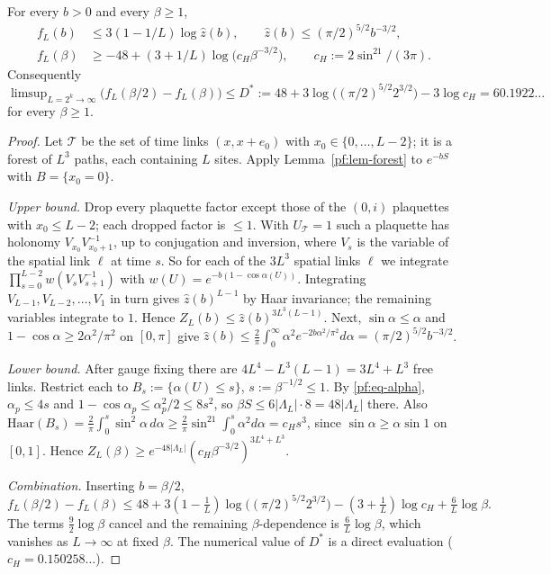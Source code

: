 \begin{lemma}\label{pf:lem-free}
For every $b>0$ and every $\beta\ge1$,
\begin{align*}
f_L(b)&\le3(1-1/L)\log\hat z(b),\qquad \hat z(b)\le(\pi/2)^{5/2}b^{-3/2},\\
f_L(\beta)&\ge-48+(3+1/L)\log\big(c_H\beta^{-3/2}\big),\qquad c_H:=2\sin^21/(3\pi).
\end{align*}
Consequently $\limsup_{L=2^k\to\infty}\big(f_L(\beta/2)-f_L(\beta)\big)\le D^*:=48+3\log\big((\pi/2)^{5/2}2^{3/2}\big)-3\log c_H=60.1922\ldots$ for every $\beta\ge1$.
\end{lemma}

\begin{proof}
Let $\mathcal T$ be the set of time links $(x,x+e_0)$ with $x_0\in\{0,\dots,L-2\}$; it is a forest of $L^3$ paths, each containing $L$ sites. Apply Lemma~\ref{pf:lem-forest} to $e^{-bS}$ with $B=\{x_0=0\}$.

\emph{Upper bound.} Drop every plaquette factor except those of the $(0,i)$ plaquettes with $x_0\le L-2$; each dropped factor is $\le1$. With $U_{\mathcal T}=1$ such a plaquette has holonomy $V_{x_0}V_{x_0+1}^{-1}$, up to conjugation and inversion, where $V_s$ is the variable of the spatial link $\ell$ at time $s$. So for each of the $3L^3$ spatial links $\ell$ we integrate $\prod_{s=0}^{L-2}w(V_sV_{s+1}^{-1})$ with $w(U)=e^{-b(1-\cos\alpha(U))}$. Integrating $V_{L-1},V_{L-2},\dots,V_1$ in turn gives $\hat z(b)^{L-1}$ by Haar invariance; the remaining variables integrate to $1$. Hence $Z_L(b)\le\hat z(b)^{3L^3(L-1)}$. Next, $\sin\alpha\le\alpha$ and $1-\cos\alpha\ge2\alpha^2/\pi^2$ on $[0,\pi]$ give
$\hat z(b)\le\frac2\pi\int_0^\infty\alpha^2e^{-2b\alpha^2/\pi^2}d\alpha=(\pi/2)^{5/2}b^{-3/2}$.

\emph{Lower bound.} After gauge fixing there are $4L^4-L^3(L-1)=3L^4+L^3$ free links. Restrict each to $B_s:=\{\alpha(U)\le s\}$, $s:=\beta^{-1/2}\le1$. By \eqref{pf:eq-alpha}, $\alpha_p\le4s$ and $1-\cos\alpha_p\le\alpha_p^2/2\le8s^2$, so $\beta S\le6|\Lambda_L|\cdot8=48|\Lambda_L|$ there. Also $\mathrm{Haar}(B_s)=\frac2\pi\int_0^s\sin^2\alpha\,d\alpha\ge\frac2\pi\sin^21\int_0^s\alpha^2d\alpha=c_Hs^3$, since $\sin\alpha\ge\alpha\sin1$ on $[0,1]$. Hence $Z_L(\beta)\ge e^{-48|\Lambda_L|}(c_H\beta^{-3/2})^{3L^4+L^3}$.

\emph{Combination.} Inserting $b=\beta/2$,
\[
f_L(\beta/2)-f_L(\beta)\le48+3(1-\tfrac1L)\log\big((\pi/2)^{5/2}2^{3/2}\big)-(3+\tfrac1L)\log c_H+\tfrac6L\log\beta .
\]
The terms $\tfrac92\log\beta$ cancel and the remaining $\beta$-dependence is $\tfrac6L\log\beta$, which vanishes as $L\to\infty$ at fixed $\beta$. The numerical value of $D^*$ is a direct evaluation ($c_H=0.150258\ldots$).
\end{proof}


